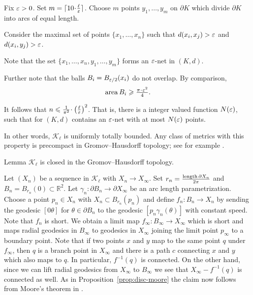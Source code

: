 \documentclass{article}
\begin{document}
Fix $\varepsilon>0$. 
Set $m=\lceil 10\cdot\tfrac\ell\eps\rceil$.
Choose $m$ points $y_1,\dots,y_m$ on $\partial K$
which divide $\partial K$ into arcs of equal length.

Consider the maximal set of points $\{x_1,\dots,x_n\}$ such that $d(x_i,x_j)>\varepsilon$ and $d(x_i,y_j)>\varepsilon$.

Note that the set $\{x_1,\dots,x_n,y_1,\dots,y_m\}$
forms an $\varepsilon$-net in $(K,d)$.

Further note that the balls $B_i=B_{\varepsilon/2}(x_i)$
do not overlap.
By comparison,
\[\area B_i\ge \tfrac{\pi\cdot\eps^2}{4}.\]

It follows that $n\le \tfrac{1}{\pi^2}\cdot\left(\tfrac\ell\eps\right)^2$.
That is, there is a integer valued function $N(\varepsilon)$,
such that for  
$(K,d)$ contains an $\varepsilon$-net
with at most $N(\varepsilon)$ points.

In other words, $\mathcal{K}_\ell$ is uniformly totally bounded.
Any class of metrics with this property is precompact in Gromov--Hausdorff topology; 
see for example \cite[7.4.15]{BBI}.
\qeds





\begin{thm}{Lemma}\label{lem:closed}
$\mathcal{K}_\ell$ is closed in the Gromov--Hausdorff topology.
\end{thm}

Let $(X_n)$ be a sequence in $\mathcal{K}_\ell$ with $X_n\to X_\infty$. 
Set $r_n=\frac{\mathop{\rm length}\nolimits\partial X_n}{2\pi}$ 
and $B_n=B_{r_n}(0)\subset \mathbb{R}^2$.
Let $\gamma_n:\partial B_n\to\partial X_\infty$ be an arc length parametrization.
Choose a point $p_n\in X_n$ with $X_n\subset B_{r_n}(p_n)$ and define
$f_n:B_n\to X_n$ by sending the geodesic $[0\theta]$ for $\theta\in\partial B_n$ to the geodesic $[p_n\gamma_n(\theta)]$ with constant speed. 
Note that $f_n$ is short.
We obtain a limit map $f_\infty:B_\infty\to X_\infty$ which is short and maps radial geodesics in $B_\infty$ to geodesics in $X_\infty$ joining the limit point $p_\infty$
to a boundary point.
Note that if two points $x$  and $y$ map to the same point $q$ under $f_\infty$, then $q$ is a branch point in $X_\infty$ and there is a path $c$ connecting 
$x$ and $y$ which also maps to $q$. 
In particular, $f^{-1}(q)$ is connected.
On the other hand, since we can lift radial geodesics from $X_\infty$ to $B_\infty$ we see that $X_\infty-f^{-1}(q)$
is connected as well.
As in Proposition~\ref{prop:disc-moore} the claim now follows from Moore's theorem in \cite{moore}.
\qeds
\end{document}
